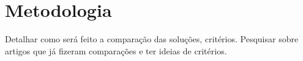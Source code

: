 \chapter{Metodologia}
Detalhar como será feito a comparação das soluções, critérios.
Pesquisar sobre artigos que já fizeram comparações e ter ideias de critérios.